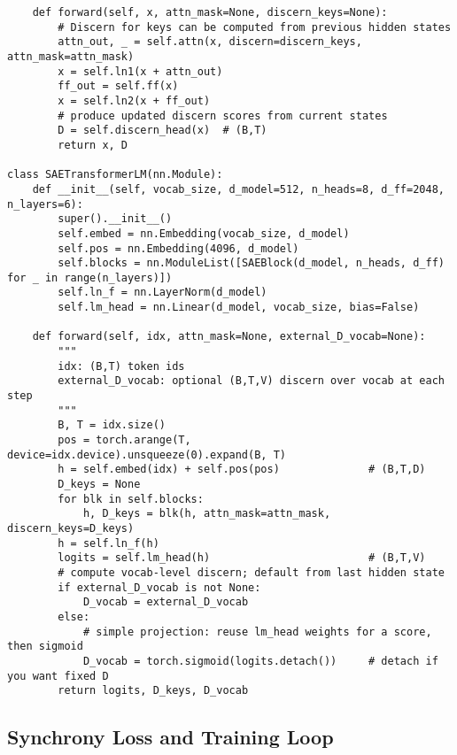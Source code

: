 \documentclass[11pt]{article}
\theoremstyle{plain}
\theoremstyle{definition}
\theoremstyle{remark}
\begin{document}
\begin{verbatim}
    def forward(self, x, attn_mask=None, discern_keys=None):
        # Discern for keys can be computed from previous hidden states
        attn_out, _ = self.attn(x, discern=discern_keys, attn_mask=attn_mask)
        x = self.ln1(x + attn_out)
        ff_out = self.ff(x)
        x = self.ln2(x + ff_out)
        # produce updated discern scores from current states
        D = self.discern_head(x)  # (B,T)
        return x, D

class SAETransformerLM(nn.Module):
    def __init__(self, vocab_size, d_model=512, n_heads=8, d_ff=2048, n_layers=6):
        super().__init__()
        self.embed = nn.Embedding(vocab_size, d_model)
        self.pos = nn.Embedding(4096, d_model)
        self.blocks = nn.ModuleList([SAEBlock(d_model, n_heads, d_ff) for _ in range(n_layers)])
        self.ln_f = nn.LayerNorm(d_model)
        self.lm_head = nn.Linear(d_model, vocab_size, bias=False)

    def forward(self, idx, attn_mask=None, external_D_vocab=None):
        """
        idx: (B,T) token ids
        external_D_vocab: optional (B,T,V) discern over vocab at each step
        """
        B, T = idx.size()
        pos = torch.arange(T, device=idx.device).unsqueeze(0).expand(B, T)
        h = self.embed(idx) + self.pos(pos)              # (B,T,D)
        D_keys = None
        for blk in self.blocks:
            h, D_keys = blk(h, attn_mask=attn_mask, discern_keys=D_keys)
        h = self.ln_f(h)
        logits = self.lm_head(h)                         # (B,T,V)
        # compute vocab-level discern; default from last hidden state
        if external_D_vocab is not None:
            D_vocab = external_D_vocab
        else:
            # simple projection: reuse lm_head weights for a score, then sigmoid
            D_vocab = torch.sigmoid(logits.detach())     # detach if you want fixed D
        return logits, D_keys, D_vocab
\end{verbatim}

\subsection{Synchrony Loss and Training Loop}
\end{document}
